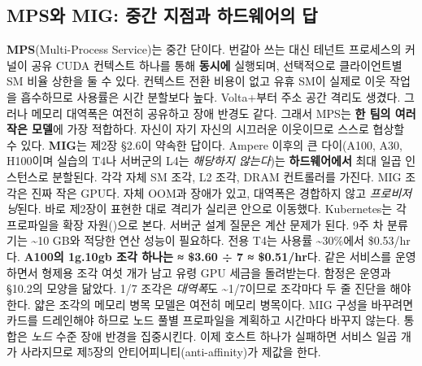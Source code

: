 \subsection*{MPS와 MIG: 중간 지점과 하드웨어의 답}

\textbf{MPS}(Multi-Process Service)는 중간 단이다. 번갈아 쓰는 대신 테넌트 프로세스의 커널이 공유 CUDA 컨텍스트 하나를 통해 \textbf{동시에} 실행되며, 선택적으로 클라이언트별 SM 비율 상한을 둘 수 있다. 컨텍스트 전환 비용이 없고 유휴 SM이 실제로 이웃 작업을 흡수하므로 사용률은 시간 분할보다 높다. Volta+부터 주소 공간 격리도 생겼다. 그러나 메모리 대역폭은 여전히 공유하고 장애 반경도 같다. 그래서 MPS는 \textbf{한 팀의 여러 작은 모델}에 가장 적합하다. 자신이 자기 자신의 시끄러운 이웃이므로 스스로 협상할 수 있다. \textbf{MIG}는 제2장 §2.6이 약속한 답이다. Ampere 이후의 큰 다이(A100, A30, H100이며 실습의 T4나 서버군의 L4는 \textit{해당하지 않는다})는 \textbf{하드웨어에서} 최대 일곱 인스턴스로 분할된다. 각각 자체 SM 조각, L2 조각, DRAM 컨트롤러를 가진다. MIG 조각은 진짜 작은 GPU다. 자체 OOM과 장애가 있고, 대역폭은 경합하지 않고 \textit{프로비저닝}된다. 바로 제2장이 표현한 대로 격리가 실리콘 안으로 이동했다. Kubernetes는 각 프로파일을 확장 자원()으로 본다. 서버군 설계 질문은 계산 문제가 된다. 9주 차 분류기는 \textasciitilde{}10 GB와 적당한 연산 성능이 필요하다. 전용 T4는 사용률 \textasciitilde{}30\%에서 \$0.53/hr다. \textbf{A100의 1g.10gb 조각 하나는 ≈ \$3.60 ÷ 7 ≈ \$0.51/hr}다. 같은 서비스를 운영하면서 형제용 조각 여섯 개가 남고 유령 GPU 세금을 돌려받는다. 함정은 운영과 §10.2의 모양을 닮았다. 1/7 조각은 \textit{대역폭}도 \textasciitilde{}1/7이므로 조각마다 두 줄 진단을 해야 한다. 얇은 조각의 메모리 병목 모델은 여전히 메모리 병목이다. MIG 구성을 바꾸려면 카드를 드레인해야 하므로 노드 풀별 프로파일을 계획하고 시간마다 바꾸지 않는다. 통합은 \textit{노드} 수준 장애 반경을 집중시킨다. 이제 호스트 하나가 실패하면 서비스 일곱 개가 사라지므로 제5장의 안티어피니티(anti-affinity)가 제값을 한다.

